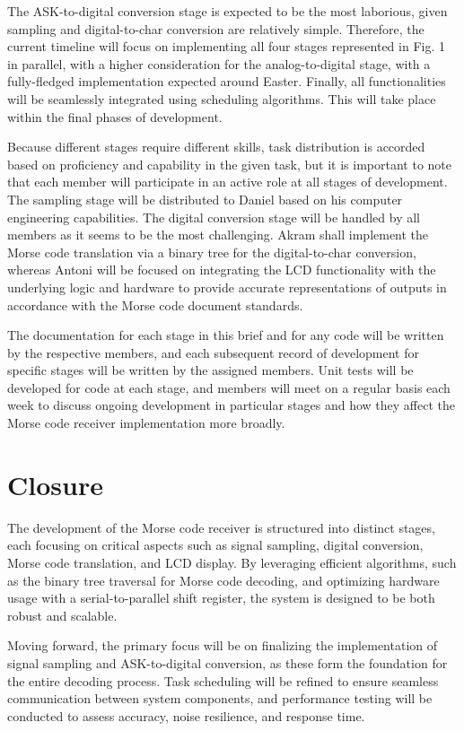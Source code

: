 \documentclass{cce2014-design}
\begin{document}
The ASK-to-digital conversion stage is expected to be the most laborious, given sampling and digital-to-char conversion are relatively simple. Therefore, the current timeline will focus on implementing all four stages represented in Fig. 1 in parallel, with a higher consideration for the analog-to-digital stage, with a fully-fledged implementation expected around Easter. Finally, all functionalities will be seamlessly integrated using scheduling algorithms. This will take place within the final phases of development.

Because different stages require different skills, task distribution is accorded based on proficiency and capability in the given task, but it is important to note that each member will participate in an active role at all stages of development. The sampling stage will be distributed to Daniel based on his computer engineering capabilities. The digital conversion stage will be handled by all members as it seems to be the most challenging. Akram shall implement the Morse code translation via a binary tree for the digital-to-char conversion, whereas Antoni will be focused on integrating the LCD functionality with the underlying logic and hardware to provide accurate representations of outputs in accordance with the Morse code document standards.

The documentation for each stage in this brief and for any code will be written by the respective members, and each subsequent record of development for specific stages will be written by the assigned members. Unit tests will be developed for code at each stage, and members will meet on a regular basis each week to discuss ongoing development in particular stages and how they affect the Morse code receiver implementation more broadly.

\section{Closure}
The development of the Morse code receiver is structured into distinct stages, each focusing on critical aspects such as signal sampling, digital conversion, Morse code translation, and LCD display. By leveraging efficient algorithms, such as the binary tree traversal for Morse code decoding, and optimizing hardware usage with a serial-to-parallel shift register, the system is designed to be both robust and scalable.

Moving forward, the primary focus will be on finalizing the implementation of signal sampling and ASK-to-digital conversion, as these form the foundation for the entire decoding process. Task scheduling will be refined to ensure seamless communication between system components, and performance testing will be conducted to assess accuracy, noise resilience, and response time.
\end{document}
